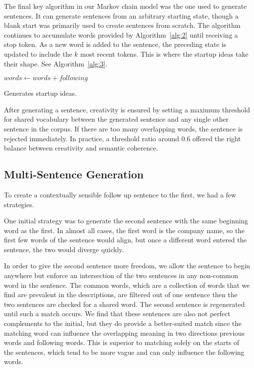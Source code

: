 \documentclass[11pt]{article}
\begin{document}
The final key algorithm in our Markov chain model was the one used to generate sentences. It can generate sentences from an arbitrary starting state, though a blank start was primarily used to create sentences from scratch. The algorithm continues to accumulate words provided by Algorithm~\ref{alg:2} until receiving a stop token. As a new word is added to the sentence, the preceding state is updated to include the \(k\) most recent tokens. This is where the startup ideas take their shape. See Algorithm~\ref{alg:3}.

\begin{algorithm}
  \begin{algorithmic}

        {$words \gets words + following$}
      \EndIf
    \EndWhile
    \EndProcedure{}
  \end{algorithmic}
  \caption{Generates startup ideas.}
  \label{alg:3}
\end{algorithm}

After generating a sentence, creativity is ensured by setting a maximum threshold for shared vocabulary between the generated sentence and any single other sentence in the corpus. If there are too many overlapping words, the sentence is rejected immediately. In practice, a threshold ratio around 0.6 offered the right balance between creativity and semantic coherence.

\subsection{Multi-Sentence Generation}
To create a contextually sensible follow up sentence to the first, we had a few strategies. 

One initial strategy was to generate the second sentence with the same beginning word as the first. In almost all cases, the first word is the company name, so the first few words of the sentence would align, but once a different word entered the sentence, the two would diverge quickly. 

In order to give the second sentence more freedom, we allow the sentence to begin anywhere but enforce an intersection of the two sentences in any non-common word in the sentence. The common words, which are a collection of words that we find are prevalent in the descriptions, are filtered out of one sentence then the two sentences are checked for a shared word. The second sentence is regenerated until such a match occurs. We find that these sentences are also not perfect complements to the initial, but they do provide a better-suited match since the matching word can influence the overlapping meaning in two directions \textemdash previous words and following words. This is superior to matching solely on the starts of the sentences, which tend to be more vague and can only influence the following words. 
\end{document}

